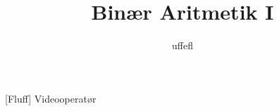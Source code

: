 \documentclass[a4paper,11pt]{article}
\title{Binær Aritmetik I}
\author{uffefl}
\begin{document}
\maketitle

\begin{roles}
[Fluff] Videooperatør
\end{roles}

\begin{props}
\prop{}
\end{props}

\begin{sketch}


\end{sketch}
\end{document}
